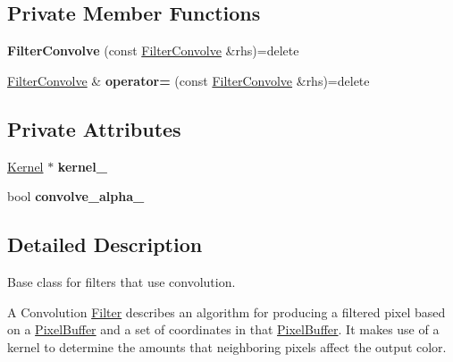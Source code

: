 \subsection*{Private Member Functions}
\begin{DoxyCompactItemize}
\item 
{\bfseries Filter\+Convolve} (const \hyperlink{classimage__tools_1_1FilterConvolve}{Filter\+Convolve} \&rhs)=delete\hypertarget{classimage__tools_1_1FilterConvolve_a3f8e1427849667ee8fdc762e702ef51f}{}\label{classimage__tools_1_1FilterConvolve_a3f8e1427849667ee8fdc762e702ef51f}

\item 
\hyperlink{classimage__tools_1_1FilterConvolve}{Filter\+Convolve} \& {\bfseries operator=} (const \hyperlink{classimage__tools_1_1FilterConvolve}{Filter\+Convolve} \&rhs)=delete\hypertarget{classimage__tools_1_1FilterConvolve_a1162e6ba278b5d34ab10cf606824bdfc}{}\label{classimage__tools_1_1FilterConvolve_a1162e6ba278b5d34ab10cf606824bdfc}

\end{DoxyCompactItemize}
\subsection*{Private Attributes}
\begin{DoxyCompactItemize}
\item 
\hyperlink{classimage__tools_1_1Kernel}{Kernel} $\ast$ {\bfseries kernel\+\_\+}\hypertarget{classimage__tools_1_1FilterConvolve_accd0997ec304cd1f73e9c831ce4ca43d}{}\label{classimage__tools_1_1FilterConvolve_accd0997ec304cd1f73e9c831ce4ca43d}

\item 
bool {\bfseries convolve\+\_\+alpha\+\_\+}\hypertarget{classimage__tools_1_1FilterConvolve_a280a5b6811bba56755972f9a67315b4b}{}\label{classimage__tools_1_1FilterConvolve_a280a5b6811bba56755972f9a67315b4b}

\end{DoxyCompactItemize}


\subsection{Detailed Description}
Base class for filters that use convolution. 

A Convolution \hyperlink{classimage__tools_1_1Filter}{Filter} describes an algorithm for producing a filtered pixel based on a \hyperlink{classimage__tools_1_1PixelBuffer}{Pixel\+Buffer} and a set of coordinates in that \hyperlink{classimage__tools_1_1PixelBuffer}{Pixel\+Buffer}. It makes use of a kernel to determine the amounts that neighboring pixels affect the output color. 

